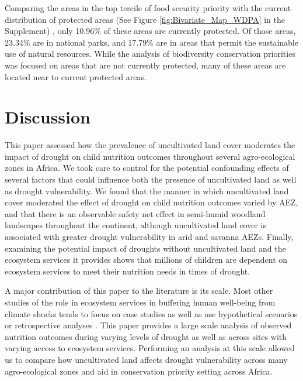 \documentclass{article}
\begin{document}
Comparing the areas in the top tercile of food security priority with the current distribution of protected areas (See Figure \ref{fig:Bivariate_Map_WDPA} in the Supplement) \cite{UNEP-WCMC2021}, only 10.96\% of these areas are currently protected.  Of those areas, 23.34\% are in national parks, and 17.79\% are in areas that permit the sustainable use of natural resources.  While the analysis of biodiversity conservation priorities was focused on areas that are not currently protected, many of these areas are located near to current protected areas.

\section{Discussion}

This paper assessed how the prevalence of uncultivated land cover moderates the impact of drought on child nutrition outcomes throughout several agro-ecological zones in Africa.  We took care to control for the potential confounding effects of several factors that could influence both the presence of uncultivated land as well as drought vulnerability.  We found that the manner in which uncultivated land cover moderated the effect of drought on child nutrition outcomes varied by AEZ, and that there is an observable safety net effect in semi-humid woodland landscapes throughout the continent, although uncultivated land cover is associated with greater drought vulnerability in arid and savanna AEZs.  Finally, examining the potential impact of droughts without uncultivated land and the ecosystem services it provides shows that millions of children are dependent on ecosystem services to meet their nutrition needs in times of drought.

A major contribution of this paper to the literature is its scale.  Most other studies of the role in ecosystem services in buffering human well-being from climate shocks tends to focus on case studies \cite{Debela2012} as well as use hypothetical scenarios \cite{Robledo2012} or retrospective analyses \cite{Muller2008}.  This paper provides a large scale analysis of observed nutrition outcomes during varying levels of drought as well as across sites with varying access to ecosystem services.  Performing an analysis at this scale allowed us to compare how uncultivated land affects drought vulnerability across many agro-ecological zones and aid in conservation priority setting across Africa.
\end{document}
